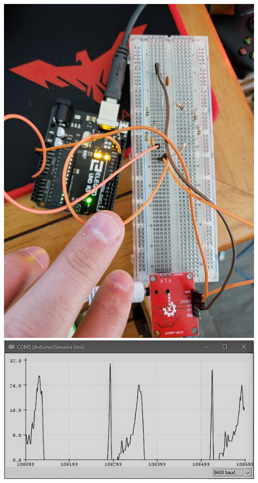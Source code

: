 \documentclass[12pt]{article}
\begin{document}
				\begin{center}
					\includegraphics[scale=0.12]{filter.jpg}\\
					\vspace{1cm}
					\includegraphics[scale=0.4]{filter_plotter.PNG}
				\end{center}
\end{document}
